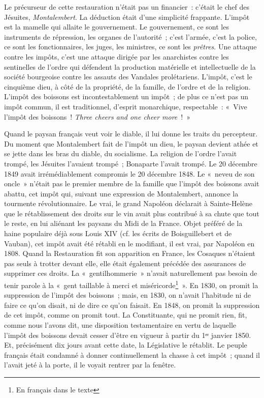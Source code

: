 \documentclass[twoside]{book} %
\begin{document}
Le précurseur de cette restauration n’était pas un financier : c’était le chef des Jésuites, \emph{Montalembert}. La déduction était d’une simplicité frappante. L’impôt est la mamelle qui allaite le gouvernement. Le gouvernement, ce sont les instruments de répression, les organes de l’autorité ; c’est l’armée, c’est la police, ce sont les fonctionnaires, les juges, les ministres, ce sont les \emph{prêtres}. Une attaque contre les impôts, c’est une attaque dirigée par les anarchistes contre les sentinelles de l’ordre qui défendent la production matérielle et intellectuelle de la société bourgeoise contre les assauts des Vandales prolétariens. L’impôt, c’est le cinquième dieu, à côté de la propriété, de la famille, de l’ordre et de la religion. L’impôt des boissons est incontestablement un impôt ; de plus ce n’est pas un impôt commun, il est traditionnel, d’esprit monarchique, respectable : « Vive l’impôt des boissons ! \emph{Three cheers and one cheer more} ! »\par
Quand le paysan français veut voir le diable, il lui donne les traits du percepteur. Du moment que Montalembert fait de l’impôt un dieu, le paysan devient athée et se jette dans les bras du diable, du socialisme. La religion de l’ordre l’avait trompé, les Jésuites l’avaient trompé ; Bonaparte l’avait trompé. Le 20 décembre 1849 avait irrémédiablement compromis le 20 décembre 1848. Le « neveu de son oncle » n’était pas le premier membre de la famille que l’impôt des boissons avait abattu, cet impôt qui, suivant une expression de Montalembert, annonce la tourmente révolutionnaire. Le vrai, le grand Napoléon déclarait à Sainte-Helène que le rétablissement des droits sur le vin avait plus contribué à sa chute que tout le reste, en lui aliénant les paysans du Midi de la France. Objet préféré de la haine populaire déjà sous Louis XIV (cf. les écrits de Boisguillebert et de Vauban), cet impôt avait été rétabli en le modifiant, il est vrai, par Napoléon en 1808. Quand la Restauration fit son apparition en France, les Cosaques n’étaient pas seuls à trotter devant elle, elle était également précédée des assurances de supprimer ces droits. La « gentilhommerie » n’avait naturellement pas besoin de tenir parole à la « gent taillable à merci et miséricorde\footnote{En français dans le texte} ». En 1830, on promit la suppression de l’impôt des boissons ; mais, en 1830, on n’avait l’habitude ni de faire ce qu’on disait, ni de dire ce qu’on faisait. En 1848, on promit la suppression de cet impôt, comme on promit tout. La Constituante, qui ne promit rien, fit, comme nous l’avons dit, une disposition testamentaire en vertu de laquelle l’impôt des boissons devait cesser d’être en vigueur à partir du 1ᵉʳ janvier 1850. Et, précisément dix jours avant cette date, la Législative le rétablit. Le peuple français était condamné à donner continuellement la chasse à cet impôt ; quand il l’avait jeté à la porte, il le voyait rentrer par la fenêtre.\par
\end{document}
